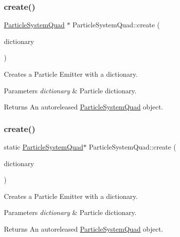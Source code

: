 \subsubsection{\texorpdfstring{create()}{create()}\hspace{0.1cm}{\footnotesize\ttfamily [5/6]}}
{\footnotesize\ttfamily \hyperlink{classParticleSystemQuad}{Particle\+System\+Quad} $\ast$ Particle\+System\+Quad\+::create (\begin{DoxyParamCaption}\item[{Value\+Map \&}]{dictionary }\end{DoxyParamCaption})\hspace{0.3cm}{\ttfamily [static]}}

Creates a Particle Emitter with a dictionary.


\begin{DoxyParams}{Parameters}
{\em dictionary} & Particle dictionary. \\
\hline
\end{DoxyParams}
\begin{DoxyReturn}{Returns}
An autoreleased \hyperlink{classParticleSystemQuad}{Particle\+System\+Quad} object. 
\end{DoxyReturn}
\mbox{\label{classParticleSystemQuad_a4f944783dad0ee9d2aa6724a78c516c2}} 
\subsubsection{\texorpdfstring{create()}{create()}\hspace{0.1cm}{\footnotesize\ttfamily [6/6]}}
{\footnotesize\ttfamily static \hyperlink{classParticleSystemQuad}{Particle\+System\+Quad}$\ast$ Particle\+System\+Quad\+::create (\begin{DoxyParamCaption}\item[{Value\+Map \&}]{dictionary }\end{DoxyParamCaption})\hspace{0.3cm}{\ttfamily [static]}}

Creates a Particle Emitter with a dictionary.


\begin{DoxyParams}{Parameters}
{\em dictionary} & Particle dictionary. \\
\hline
\end{DoxyParams}
\begin{DoxyReturn}{Returns}
An autoreleased \hyperlink{classParticleSystemQuad}{Particle\+System\+Quad} object. 
\end{DoxyReturn}
\mbox{\label{classParticleSystemQuad_a74274ad70cb4fe2db9f5a53a18e22823}} 
